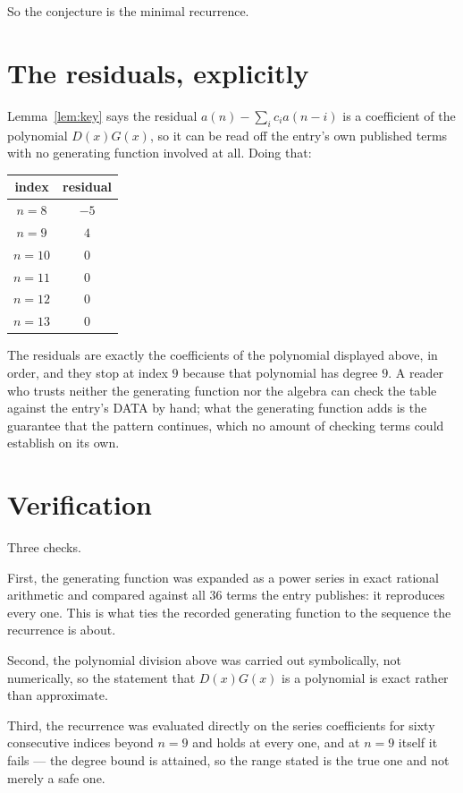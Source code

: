 \documentclass[11pt,a4paper]{article}
\theoremstyle{plain}
\theoremstyle{definition}
\begin{document}
So the conjecture is the minimal recurrence.

\section{The residuals, explicitly}

Lemma~\ref{lem:key} says the residual $a(n)-\sum_ic_ia(n-i)$ is a coefficient of the
polynomial $D(x)G(x)$, so it can be read off the entry's own published terms with no
generating function involved at all. Doing that:
\begin{center}
\begin{tabular}{cc}
index & residual \\ \hline
$n=8$ & $-5$ \\
$n=9$ & $4$ \\
$n=10$ & $0$ \\
$n=11$ & $0$ \\
$n=12$ & $0$ \\
$n=13$ & $0$
\end{tabular}
\end{center}
The residuals are exactly the coefficients of the polynomial displayed above, in order, and
they stop at index $9$ because that polynomial has degree $9$. A reader who trusts
neither the generating function nor the algebra can check the table against the entry's DATA
by hand; what the generating function adds is the guarantee that the pattern continues, which
no amount of checking terms could establish on its own.

\section{Verification}

Three checks.

First, the generating function was expanded as a power series in exact rational arithmetic and
compared against all $36$ terms the entry publishes: it reproduces every one. This is
what ties the recorded generating function to the sequence the recurrence is about.

Second, the polynomial division above was carried out symbolically, not numerically, so the
statement that $D(x)G(x)$ is a polynomial is exact rather than approximate.

Third, the recurrence was evaluated directly on the series coefficients for sixty consecutive
indices beyond $n=9$ and holds at every one, and at $n=9$ itself it fails --- the
degree bound is attained, so the range stated is the true one and not merely a safe one.
\end{document}
